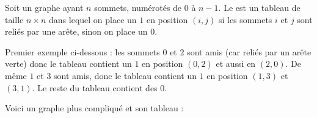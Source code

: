 \documentclass[11pt,class=report,crop=false]{standalone}
\begin{document}
\begin{cours}[Modélisation]



Soit un graphe ayant $n$ sommets, numérotés de $0$ à $n-1$.
Le  est un tableau de taille $n \times n$ dans lequel on place un $1$ en position $(i,j)$ si les sommets $i$ et $j$ sont reliés par une arête, sinon on place un $0$.

\bigskip
Premier exemple ci-dessous : les sommets $0$ et $2$ sont amis (car reliés par un arête verte) donc le tableau contient un $1$ en position $(0,2)$ et aussi en $(2,0)$. De même $1$ et $3$ sont amis, donc le tableau contient un $1$ en position $(1,3)$ et $(3,1)$. Le reste du tableau contient des $0$.


Voici un graphe plus compliqué et son tableau :

\end{cours}



\end{document}
